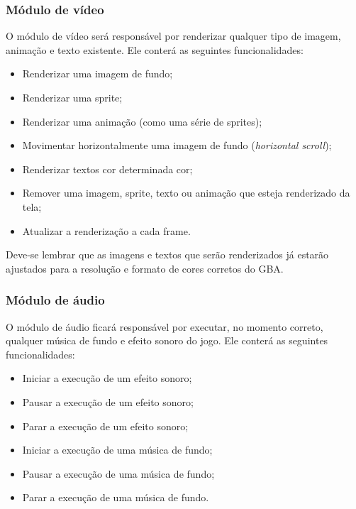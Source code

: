     \subsubsection{Módulo de vídeo}

      O módulo de vídeo será responsável por renderizar qualquer tipo de imagem, animação e texto existente. Ele conterá as seguintes funcionalidades:

      \begin{itemize}
        \item Renderizar uma imagem de fundo;
        \item Renderizar uma sprite;
        \item Renderizar uma animação (como uma série de sprites);
        \item Movimentar horizontalmente uma imagem de fundo (\textit{horizontal scroll});
        \item Renderizar textos cor determinada cor;
        \item Remover uma imagem, sprite, texto ou animação que esteja renderizado da tela;
        \item Atualizar a renderização a cada frame.
      \end{itemize}

      Deve-se lembrar que as imagens e textos que serão renderizados já estarão ajustados para a resolução e formato de cores corretos do GBA.

    \subsubsection{Módulo de áudio}

      O módulo de áudio ficará responsável por executar, no momento correto, qualquer música de fundo e efeito sonoro do jogo. Ele conterá as seguintes funcionalidades:

      \begin{itemize}
        \item Iniciar a execução de um efeito sonoro;
        \item Pausar a execução de um efeito sonoro;
        \item Parar a execução de um efeito sonoro;
        \item Iniciar a execução de uma música de fundo;
        \item Pausar a execução de uma música de fundo;
        \item Parar a execução de uma música de fundo.
      \end{itemize}

